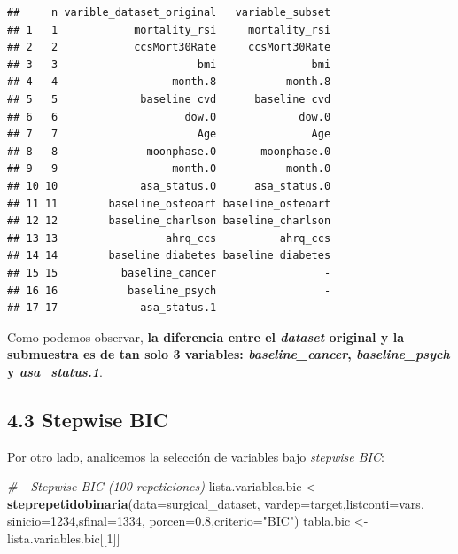 \documentclass[
]{article}
\newenvironment{Shaded}{\begin{snugshade}}{\end{snugshade}}
\newcommand{\CommentTok}[1]{\textcolor[rgb]{0.56,0.35,0.01}{\textit{#1}}}
\newcommand{\DataTypeTok}[1]{\textcolor[rgb]{0.13,0.29,0.53}{#1}}
\newcommand{\DecValTok}[1]{\textcolor[rgb]{0.00,0.00,0.81}{#1}}
\newcommand{\FloatTok}[1]{\textcolor[rgb]{0.00,0.00,0.81}{#1}}
\newcommand{\KeywordTok}[1]{\textcolor[rgb]{0.13,0.29,0.53}{\textbf{#1}}}
\newcommand{\NormalTok}[1]{#1}
\newcommand{\StringTok}[1]{\textcolor[rgb]{0.31,0.60,0.02}{#1}}
\begin{document}
\begin{verbatim}
##     n varible_dataset_original   variable_subset
## 1   1            mortality_rsi     mortality_rsi
## 2   2            ccsMort30Rate     ccsMort30Rate
## 3   3                      bmi               bmi
## 4   4                  month.8           month.8
## 5   5             baseline_cvd      baseline_cvd
## 6   6                    dow.0             dow.0
## 7   7                      Age               Age
## 8   8              moonphase.0       moonphase.0
## 9   9                  month.0           month.0
## 10 10             asa_status.0      asa_status.0
## 11 11        baseline_osteoart baseline_osteoart
## 12 12        baseline_charlson baseline_charlson
## 13 13                 ahrq_ccs          ahrq_ccs
## 14 14        baseline_diabetes baseline_diabetes
## 15 15          baseline_cancer                 -
## 16 16           baseline_psych                 -
## 17 17             asa_status.1                 -
\end{verbatim}

Como podemos observar, \textbf{la diferencia entre el \emph{dataset}
original y la submuestra es de tan solo 3 variables:
\emph{baseline\_cancer}, \emph{baseline\_psych} y \emph{asa\_status.1}}.

\hypertarget{stepwise-bic}{%
\subsection{4.3 Stepwise BIC}\label{stepwise-bic}}

Por otro lado, analicemos la selección de variables bajo \emph{stepwise
BIC}:

\begin{Shaded}
\begin{Highlighting}[]
\CommentTok{\#{-}{-} Stepwise BIC (100 repeticiones)}
\NormalTok{lista.variables.bic <{-}}\StringTok{ }\KeywordTok{steprepetidobinaria}\NormalTok{(}\DataTypeTok{data=}\NormalTok{surgical\_dataset,}
                                           \DataTypeTok{vardep=}\NormalTok{target,}\DataTypeTok{listconti=}\NormalTok{vars,}
                                           \DataTypeTok{sinicio=}\DecValTok{1234}\NormalTok{,}\DataTypeTok{sfinal=}\DecValTok{1334}\NormalTok{,}
                                           \DataTypeTok{porcen=}\FloatTok{0.8}\NormalTok{,}\DataTypeTok{criterio=}\StringTok{"BIC"}\NormalTok{)}
\NormalTok{tabla.bic <{-}}\StringTok{ }\NormalTok{lista.variables.bic[[}\DecValTok{1}\NormalTok{]]}
\end{Highlighting}
\end{Shaded}
\end{document}
